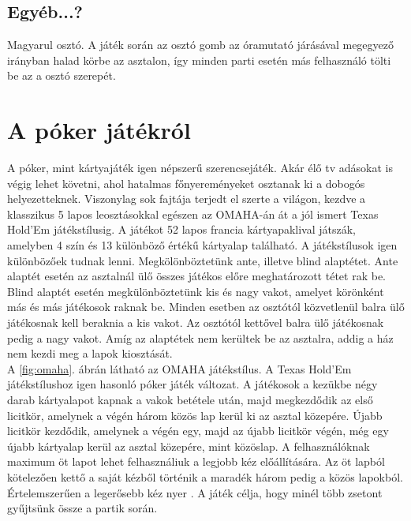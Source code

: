 \subsection{Egyéb...?}
Magyarul osztó. A játék során az osztó gomb az óramutató járásával megegyező irányban halad körbe az asztalon, így minden parti esetén más felhasználó tölti be az a osztó szerepét.

\section{A póker játékról}
A póker, mint kártyajáték igen népszerű szerencsejáték. Akár élő tv adásokat is végig lehet követni, ahol hatalmas főnyereményeket osztanak ki a dobogós helyezetteknek. Viszonylag sok fajtája terjedt el szerte a világon, kezdve a klasszikus 5 lapos leosztásokkal egészen az OMAHA-án át a jól ismert Texas Hold'Em játékstílusig. A játékot 52 lapos francia kártyapaklival játszák, amelyben 4 szín és 13 különböző értékű kártyalap található. A játékstílusok igen különbözőek tudnak lenni. Megkölönböztetünk ante, illetve blind alaptétet. Ante alaptét esetén az asztalnál ülő összes játékos előre meghatározott tétet rak be. Blind alaptét esetén megkülönböztetünk kis és nagy vakot, amelyet körönként más és más játékosok raknak be. Minden esetben az osztótól közvetlenül balra ülő játékosnak kell beraknia a kis vakot. Az osztótól kettővel balra ülő játékosnak pedig a nagy vakot. Amíg az alaptétek nem kerültek be az asztalra, addig a ház nem kezdi meg a lapok kiosztását. \\
A \ref{fig:omaha}. ábrán látható az OMAHA játékstílus. A Texas Hold'Em játékstílushoz igen hasonló póker játék változat. A játékosok a kezükbe négy darab kártyalapot kapnak a vakok betétele után, majd megkezdődik az első licitkör, amelynek a végén három közös lap kerül ki az asztal közepére. Újabb licitkör kezdődik, amelynek a végén egy, majd az újabb licitkör végén, még egy újabb kártyalap kerül az asztal közepére, mint közöslap. A felhasználóknak maximum öt lapot lehet felhasználiuk a legjobb kéz előállítására. Az öt lapból kötelezően kettő a saját kézből történik a maradék három pedig a közös lapokból. Értelemszerűen a legerősebb kéz nyer \cite{card_combinations}. A játék célja, hogy minél több zsetont gyűjtsünk össze a partik során.
